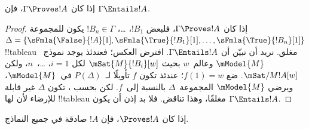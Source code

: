 \documentclass[../../../include/open-logic-section]{subfiles}
\begin{document}
\begin{cor}
إذا كان $\Gamma \Proves !A$، فإن $\Gamma \Entails !A$.
\end{cor}

\begin{proof}
  إذا كان $\Gamma \Proves !A$، فلبعض $!B_1$، \dots، $!B_n \in
  \Gamma$ يكون للمجموعة $\Delta = \{\sFmla{\False}{!A}[1],
  \sFmla{\True}{!B_1}[1], \dots, \sFmla{\True}{!B_n}[1]\}$
  !!{tableau} مغلق. نريد أن نبيّن أن $\Gamma \Entails !A$. افترض
  العكس؛ فعندئذ يوجد نموذج~$\mModel{M}$ وعالم~$w$ بحيث
  $\mSat{M}{!B_i}[w]$ لكل $i=1$، \dots،~$n$، ولكن
  $\mSat/{M}{!A}[w]$. ضع $f(1) = w$؛ عندئذ تكون $f$ تأويلًا
  لـ~$P(\Delta)$ في~$\mModel{M}$، ويرضي $\mModel{M}$ المجموعة~$\Delta$
  بالنسبة إلى~$f$. لكن بحسب ، تكون
  $\Delta$ غير قابلة للإرضاء لأن لها !!{tableau} مغلقًا، وهذا تناقض.
  فلا بد إذن أن يكون $\Gamma \Entails !A$.
\end{proof}

\begin{cor}
إذا كان $\Proves !A$، فإن $!A$ صادقة في جميع النماذج.
\end{cor}
\end{document}
